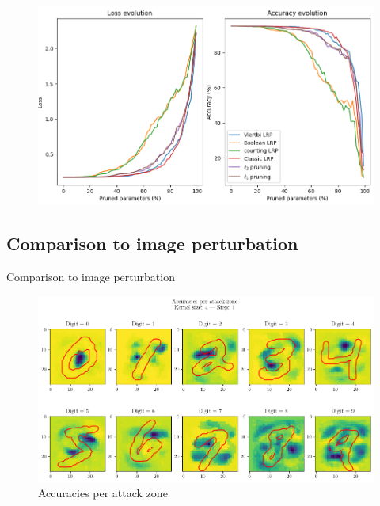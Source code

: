 \documentclass[aspectratio=169]{beamer}
\theoremstyle{definition}
\begin{document}
\begin{frame}
    \begin{figure}
        \includegraphics[width=.9\textwidth]{pruning-graph-large.png}
    \end{figure}
\end{frame}

\subsection{Comparison to image perturbation}
\begin{frame}{Comparison to image perturbation \cite{fong2017interpretable}}
    \begin{figure}
        \includegraphics[width=.75\textwidth]{attacks.png}
        \caption{Accuracies per attack zone}
    \end{figure}
\end{frame}
\end{document}
